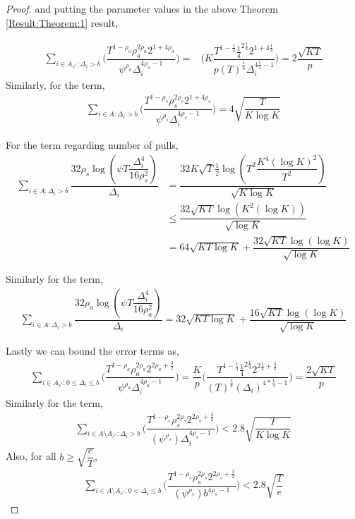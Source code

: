 \begin{proof}
and putting the parameter values in the above Theorem \ref{Result:Theorem:1} result,	
	
	\begin{align*}
	\sum_{i\in A_{s^{*}}:\Delta_{i} > b}\bigg(\dfrac{T^{1-\rho_{a}}\rho_{a}^{2\rho_{a}}2^{1+4\rho_{a}}}{\psi^{\rho_{a}}\Delta_{i}^{4\rho_{a}-1}} \bigg)=& \bigg(K\dfrac{T^{1-\frac{1}{4}}\frac{1}{4}^{2\frac{1}{4}}2^{1+4\frac{1}{4}}}{p(T)^{\frac{1}{4}}\Delta_{i}^{4\frac{1}{4}-1}} \bigg)=2\dfrac{\sqrt{KT}}{p}
	\end{align*}		
	 Similarly, for the term, 
	 \begin{align*}
	 \sum_{i\in A:\Delta_{i} > b}\bigg(\dfrac{T^{1-\rho_{s}}\rho_{s}^{2\rho_{s}}2^{1+4\rho_{s}}}{\psi^{\rho_{s}}\Delta_{i}^{4\rho_{s}-1}} \bigg) = 4\sqrt{\dfrac{T}{K\log K}}
	 \end{align*}
	 
	
	For the term regarding number of pulls,
	\begin{align*}
	\sum_{i\in A:\Delta_{i} > b}\dfrac{32\rho_{s}\log{(\psi T\dfrac{\Delta_{i}^{4}}{16\rho_{s}^{2}})}}{\Delta_{i}} &= \dfrac{32K\sqrt{T}\frac{1}{2}\log{(T^{2}\dfrac{K^{4}(\log K)^{2}}{T^{2}})}}{\sqrt{K\log K}}\\
	&\leq  \dfrac{32\sqrt{KT}\log{(K^{2}(\log K))}}{\sqrt{\log K}}\\
	&=64\sqrt{KT\log K} + \dfrac{32\sqrt{KT}\log{(\log K)}}{\sqrt{\log K}}
	\end{align*}		
	
	Similarly for the term,
	\begin{align*}
	\sum_{i\in A:\Delta_{i} > b}\dfrac{32\rho_{a}\log{(\psi T\dfrac{\Delta_{i}^{4}}{16\rho_{a}^{2}})}}{\Delta_{i}} = 32\sqrt{KT\log K} + \dfrac{16\sqrt{KT}\log{(\log K)}}{\sqrt{\log K}}
	\end{align*}		
	
 	Lastly we can bound the error terms as, 
	\begin{align*}
	\sum\limits_{i\in A_{s^{*}}:0\leq\Delta_{i}\leq b}\bigg(\dfrac{T^{1-\rho_{a}}\rho_{a}^{2\rho_{a}}2^{2\rho_{a}+\frac{3}{2}}}{\psi^{\rho_{a}}\Delta_{i}^{4\rho_{a}-1}} \bigg)=\dfrac{K}{p}\bigg(\dfrac{T^{1-\frac{1}{4}}\frac{1}{4}^{2\frac{1}{4}}2^{2\frac{1}{4}+\frac{3}{2}}}{{(T)^{\frac{1}{4}}}{(\Delta_{i})^{4*\frac{1}{4}-1}}} \bigg) = \dfrac{2 \sqrt{KT} }{p}
	\end{align*}	 	
 	Similarly for the term,
 	\begin{align*}
 	\sum_{i\in A\setminus A_{s^*}: \Delta_{i} > b}\bigg(\dfrac{T^{1-\rho_{s}}\rho_{s}^{2\rho_{s}}2^{2\rho_{s}+\frac{3}{2}}}{(\psi^{\rho_{s}})\Delta_{i}^{4\rho_{s} -1}} \bigg) < 2.8\sqrt{\dfrac{T}{K\log K}}
	\end{align*} 	
	Also, for all $b\geq \sqrt{\dfrac{e}{T}}$,
	\begin{align*}
 	\sum_{i\in A\setminus A_{s^*}: 0 < \Delta_{i} \leq b}\bigg(\dfrac{T^{1-\rho_{s}}\rho_{s}^{2\rho_{s}}2^{2\rho_{s}+\frac{3}{2}}}{(\psi^{\rho_{s}})b^{4\rho_{s} -1}} \bigg) < 2.8\sqrt{\dfrac{T}{e}}
	\end{align*} 	
 	

\end{proof}
